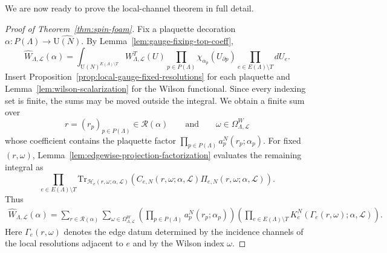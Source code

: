 \documentclass[11pt,a4paper,reqno]{article}
\theoremstyle{definition}
\theoremstyle{remark}
\newcommand\U{{\mathrm U}}
\newcommand\Tr{\mathrm{Tr}}
\newcommand\Lc{{\mathcal{L}}}
\begin{document}
We are now ready to prove the local-channel theorem in full detail.

\begin{proof}[Proof of Theorem~\ref{thm:spin-foam}]
Fix a plaquette decoration $\alpha:P(\Lambda)\to\widehat{\U(N)}$. By Lemma~\ref{lem:gauge-fixing-top-coeff},
\begin{equation}\label{eq:gauge-fixed-topological-coefficient-sec3}
\widehat W_{\Lambda,\Lc}(\alpha)
=\int_{\U(N)^{E(\Lambda)\setminus T}}
W^T_{\Lambda,\Lc}(U)
\prod_{p\in P(\Lambda)}\chi_{\alpha_p}(U_{\partial p})
\prod_{e\in E(\Lambda)\setminus T}dU_e.
\end{equation}
Insert Proposition~\ref{prop:local-gauge-fixed-resolutions} for each plaquette and Lemma~\ref{lem:wilson-scalarization} for the Wilson functional. Since every indexing set is finite, the sums may be moved outside the integral. We obtain a finite sum over
\[
r=(r_p)_{p\in P(\Lambda)}\in\mathcal R(\alpha)
\qquad\text{and}\qquad
\omega\in\Omega^W_{\Lambda,\Lc}
\]
whose coefficient contains the plaquette factor $\prod_{p\in P(\Lambda)}a_p^N(r_p;\alpha_p).$ For fixed $(r,\omega)$, Lemma~\ref{lem:edgewise-projection-factorization} evaluates the remaining integral as
\[
\prod_{e\in E(\Lambda)\setminus T}
\Tr_{\mathcal H_e(r,\omega;\alpha,\Lc)}\!\left(
C_{e,N}(r,\omega;\alpha,\Lc)
\Pi_{e,N}(r,\omega;\alpha,\Lc)
\right).
\]
Thus
\begin{align}\label{eq:precompressed-channel-sum}
\widehat W_{\Lambda,\Lc}(\alpha)
=\sum_{r\in\mathcal R(\alpha)}\sum_{\omega\in\Omega^W_{\Lambda,\Lc}}
\left(\prod_{p\in P(\Lambda)}a_p^N(r_p;\alpha_p)\right)
\left(\prod_{e\in E(\Lambda)\setminus T}
K_e^N(\Gamma_e(r,\omega);\alpha,\Lc)\right).
\end{align}
Here $\Gamma_e(r,\omega)$ denotes the edge datum determined by the incidence channels of the local resolutions adjacent to $e$ and by the Wilson index $\omega$.


\end{proof}
\end{document}
